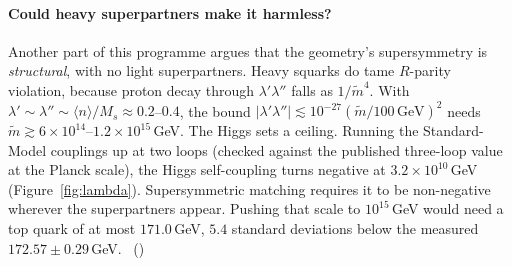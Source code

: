 \paragraph{Could heavy superpartners make it harmless?}
Another part of this programme argues that the geometry's supersymmetry is \emph{structural}, with no
light superpartners. Heavy squarks do tame $R$-parity violation, because proton decay through
$\lambda'\lambda''$ falls as $1/\tilde m^4$. With $\lambda'\sim\lambda''\sim\langle n\rangle/M_s\approx0.2$--$0.4$,
the bound $|\lambda'\lambda''|\lesssim10^{-27}(\tilde m/100\,\mathrm{GeV})^2$ needs
$\tilde m\gtrsim6\times10^{14}$--$1.2\times10^{15}$\,GeV. The Higgs sets a ceiling. Running the
Standard-Model couplings up at two loops (checked against the published three-loop value at the
Planck scale), the Higgs self-coupling turns negative at $3.2\times10^{10}$\,GeV (Figure~\ref{fig:lambda}).
Supersymmetric matching requires it to be non-negative wherever the superpartners appear. Pushing
that scale to $10^{15}$\,GeV would need a top quark of at most $171.0$\,GeV, $5.4$ standard deviations
below the measured $172.57\pm0.29$\,GeV. \tierC\ ()

